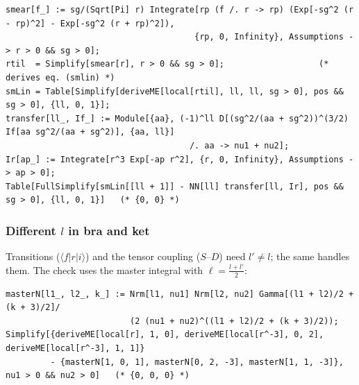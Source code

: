 \documentclass[11pt,a4paper]{article}
\numberwithin{equation}{section}
\theoremstyle{definition}
\theoremstyle{plain}
\theoremstyle{remark}
\numberwithin{algorithm}{section}
\begin{document}
\begin{lstlisting}[style=wl]
smear[f_] := sg/(Sqrt[Pi] r) Integrate[rp (f /. r -> rp) (Exp[-sg^2 (r - rp)^2] - Exp[-sg^2 (r + rp)^2]),
                                      {rp, 0, Infinity}, Assumptions -> r > 0 && sg > 0];
rtil  = Simplify[smear[r], r > 0 && sg > 0];                   (* derives eq. (smlin) *)
smLin = Table[Simplify[deriveME[local[rtil], ll, ll, sg > 0], pos && sg > 0], {ll, 0, 1}];
transfer[ll_, If_] := Module[{aa}, (-1)^ll D[(sg^2/(aa + sg^2))^(3/2) If[aa sg^2/(aa + sg^2)], {aa, ll}]
                                     /. aa -> nu1 + nu2];
Ir[ap_] := Integrate[r^3 Exp[-ap r^2], {r, 0, Infinity}, Assumptions -> ap > 0];
Table[FullSimplify[smLin[[ll + 1]] - NN[ll] transfer[ll, Ir], pos && sg > 0], {ll, 0, 1}]   (* {0, 0} *)
\end{lstlisting}

\subsubsection{Different \texorpdfstring{$l$}{l} in bra and ket}
Transitions ($\langle f|r|i\rangle$) and the tensor coupling ($S$--$D$) need $l'\ne l$; the same  handles them. The check uses the master integral with $\ell=\frac{l+l'}2$:
\begin{lstlisting}[style=wl]
masterN[l1_, l2_, k_] := Nrm[l1, nu1] Nrm[l2, nu2] Gamma[(l1 + l2)/2 + (k + 3)/2]/
                         (2 (nu1 + nu2)^((l1 + l2)/2 + (k + 3)/2));
Simplify[{deriveME[local[r], 1, 0], deriveME[local[r^-3], 0, 2], deriveME[local[r^-3], 1, 1]}
         - {masterN[1, 0, 1], masterN[0, 2, -3], masterN[1, 1, -3]}, nu1 > 0 && nu2 > 0]   (* {0, 0, 0} *)
\end{lstlisting}
\end{document}
